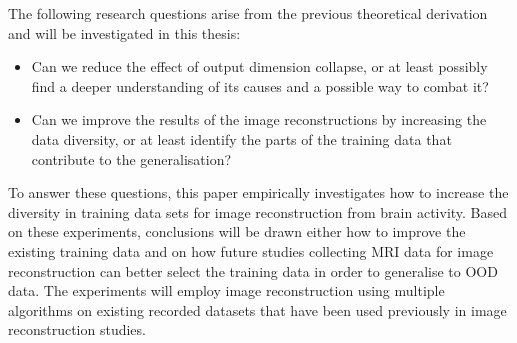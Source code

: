 The following research questions arise from the previous theoretical derivation and will be investigated in this thesis:
\begin{itemize}
    \item Can we reduce the effect of output dimension collapse, or at least possibly find a deeper understanding of its causes and a possible way to combat it?
    \item Can we improve the results of the image reconstructions by increasing the data diversity, or at least identify the parts of the training data that contribute to the generalisation?
\end{itemize}
To answer these questions, this paper empirically investigates how to increase the diversity in training data sets for image reconstruction from brain activity. Based on these experiments, conclusions will be drawn either how to improve the existing training data and on how future studies collecting MRI data for image reconstruction can better select the training data in order to generalise to OOD data. The experiments will employ image reconstruction using multiple algorithms on existing recorded datasets that have been used previously in image reconstruction studies.